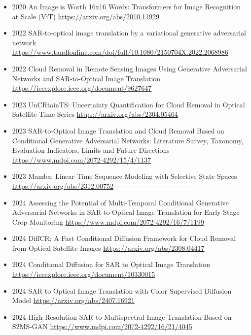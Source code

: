 \begin{itemize}
    \item 2020 An Image is Worth 16x16 Words: Transformers for Image Recognition at Scale (ViT)
    \url{https://arxiv.org/abs/2010.11929}

    \item 2022 SAR-to-optical image translation by a variational generative adversarial network
    \url{https://www.tandfonline.com/doi/full/10.1080/2150704X.2022.2068986}

    \item 2022 Cloud Removal in Remote Sensing Images Using Generative Adversarial Networks and SAR-to-Optical Image Translation
    \url{https://ieeexplore.ieee.org/document/9627647}

    \item 2023 UnCRtainTS: Uncertainty Quantification for Cloud Removal in Optical Satellite Time Series
    \url{https://arxiv.org/abs/2304.05464}
    
    \item 2023 SAR-to-Optical Image Translation and Cloud Removal Based on Conditional Generative Adversarial Networks: Literature Survey, Taxonomy, Evaluation Indicators, Limits and Future Directions
    \url{https://www.mdpi.com/2072-4292/15/4/1137}

    \item 2023 Mamba: Linear-Time Sequence Modeling with Selective State Spaces
    \url{https://arxiv.org/abs/2312.00752}
------------------------------------
    
    \item 2024 Assessing the Potential of Multi-Temporal Conditional Generative Adversarial Networks in SAR-to-Optical Image Translation for Early-Stage Crop Monitoring
        \url{https://www.mdpi.com/2072-4292/16/7/1199}
    

    \item 2024 DiffCR: A Fast Conditional Diffusion Framework for Cloud Removal from Optical Satellite Images
    \url{https://arxiv.org/abs/2308.04417}

    \item 2024  Conditional Diffusion for SAR to Optical Image Translation
    \url{https://ieeexplore.ieee.org/document/10330015}



    \item 2024  SAR to Optical Image Translation with Color Supervised Diffusion Model
    \url{https://arxiv.org/abs/2407.16921}
    

    \item 2024  High-Resolution SAR-to-Multispectral Image Translation Based on S2MS-GAN
    \url{https://www.mdpi.com/2072-4292/16/21/4045}


\end{itemize}
